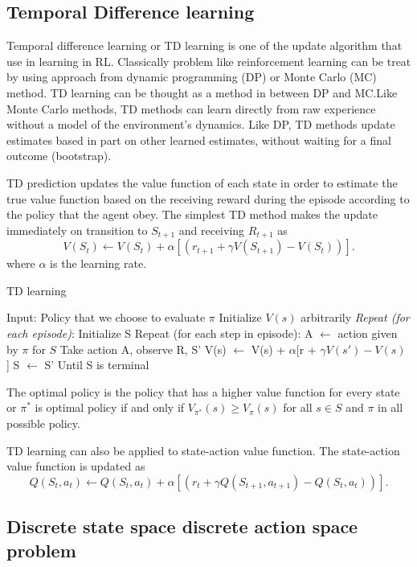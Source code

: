 \documentclass{article}
\begin{document}
\subsection{Temporal Difference learning}

Temporal difference learning or TD learning is one of the update algorithm that use in learning in RL. Classically problem like reinforcement learning can be treat by using approach from dynamic programming (DP) or Monte Carlo (MC) method. TD learning can be thought as a method in between DP and MC.Like Monte Carlo methods, TD methods can learn directly from raw experience without a model of the environment's dynamics. Like DP, TD methods update estimates based in part on other learned estimates, without waiting for a final outcome (bootstrap).

TD prediction updates the value function of each state in order to estimate the true value function based on the receiving reward during the episode according to the policy that the agent obey. The simplest TD method makes the update immediately on transition to $S_{t+1}$ and receiving $R_{t+1}$ as
$$ V(S_t) \leftarrow V(S_t) + \alpha[(r_{t+1} + \gamma V(S_{t+1}) - V(S_t))].$$ where $\alpha$ is the learning rate. 

\begin{algorithm}
\caption{TD learning}\label{TD learning}
\begin{algorithmic}[1]
\State Input: Policy that we choose to evaluate $\pi$
\State Initialize $V(s)$ arbitrarily 
\State \emph{Repeat (for each episode)}:
\State \indent Initialize S
\State \indent Repeat (for each step in episode):
\State \indent \indent A $\leftarrow$ action given by $\pi$ for $S$
\State \indent \indent Take action A, observe R, S'   
\State \indent \indent V(s) $\leftarrow$ V(s) + $\alpha$[r + $\gamma V(s') - V(s)$ ]
\State \indent \indent S $\leftarrow$ S'
\State \indent Until S is terminal
\end{algorithmic}
\end{algorithm}

The optimal policy is the policy that has a higher value function for every state or $\pi^*$ is optimal policy if and only if $V_{\pi^*}(s) \geq V_{\pi}(s)$ for all $s \in S$ and $\pi$ in all possible policy.

TD learning can also be applied to state-action value function. The state-action value function is updated as $$ Q(S_t, a_t) \leftarrow Q(S_t, a_t) + \alpha[(r_{t} + \gamma Q(S_{t+1},a_{t+1}) - Q(S_t,a_t))].$$

\subsection{Discrete state space discrete action space problem}
\end{document}
